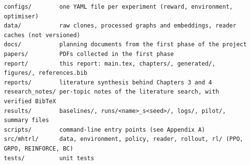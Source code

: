 \begin{footnotesize}
\begin{verbatim}
configs/        one YAML file per experiment (reward, environment, optimiser)
data/           raw clones, processed graphs and embeddings, reader caches (not versioned)
docs/           planning documents from the first phase of the project
papers/         PDFs collected in the first phase
report/         this report: main.tex, chapters/, generated/, figures/, references.bib
reports/        literature synthesis behind Chapters 3 and 4
research_notes/ per-topic notes of the literature search, with verified BibTeX
results/        baselines/, runs/<name>_s<seed>/, logs/, pilot/, summary files
scripts/        command-line entry points (see Appendix A)
src/mhtrl/      data, environment, policy, reader, rollout, rl/ (PPO, GRPO, REINFORCE, BC)
tests/          unit tests
\end{verbatim}
\end{footnotesize}
